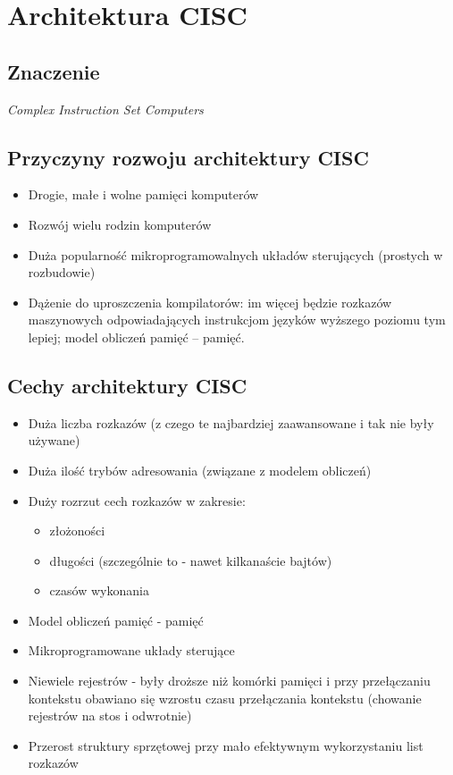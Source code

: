 \documentclass[a4paper,twoside]{article}
\begin{document}
\section{Architektura CISC}
\subsection{Znaczenie} \noindent
\emph{Complex Instruction Set Computers}

\subsection{Przyczyny rozwoju architektury CISC}
\begin{itemize}
	\item Drogie, małe i wolne pamięci komputerów
	\item Rozwój wielu rodzin komputerów
	\item Duża popularność mikroprogramowalnych układów sterujących (prostych w rozbudowie)
	\item Dążenie do uproszczenia kompilatorów: im więcej będzie rozkazów maszynowych odpowiadających instrukcjom języków wyższego poziomu tym lepiej; model obliczeń pamięć – pamięć.
\end{itemize}

\subsection{Cechy architektury CISC}
\begin{itemize}
	\item Duża liczba rozkazów (z czego te najbardziej zaawansowane i tak nie były używane)
	\item Duża ilość trybów adresowania (związane z modelem obliczeń)
	\item Duży rozrzut cech rozkazów w zakresie:
	\begin{itemize}
		\item złożoności
		\item długości (szczególnie to - nawet kilkanaście bajtów)
		\item czasów wykonania
	\end{itemize}
	\item Model obliczeń pamięć - pamięć
	\item Mikroprogramowane układy sterujące
	\item Niewiele rejestrów - były droższe niż komórki pamięci i przy przełączaniu kontekstu obawiano się wzrostu czasu przełączania kontekstu (chowanie rejestrów na stos i odwrotnie)
	\item Przerost struktury sprzętowej przy mało efektywnym wykorzystaniu list rozkazów
\end{itemize}
\end{document}
